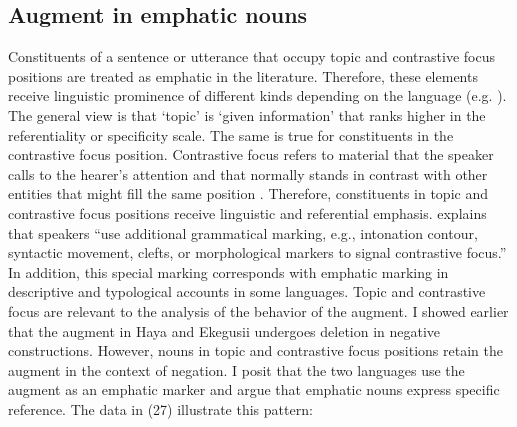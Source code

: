 \documentclass[output=paper]{langscibook}
\begin{document}
\subsection{Augment in emphatic nouns}
Constituents of a sentence or utterance that occupy topic and contrastive focus positions are treated as emphatic in the literature. Therefore, these elements receive linguistic prominence of different kinds depending on the language (e.g. \cite{gundel2004topic}). The general view is that ‘topic’ is ‘given information’ that ranks higher in the referentiality or specificity scale. The same is true for constituents in the contrastive focus position. Contrastive focus refers to material that the speaker calls to the hearer’s attention and that normally stands in contrast with other entities that might fill the same position \citep[181]{gundel2004topic}. Therefore, constituents in topic and contrastive focus positions receive linguistic and referential emphasis. \cite{zimmermann2008contrastive} explains that speakers “use additional grammatical marking, e.g., intonation contour, syntactic movement, clefts, or morphological markers to signal contrastive focus.” In addition, this special marking corresponds with emphatic marking in descriptive and typological accounts in some languages. Topic and contrastive focus are relevant to the analysis of the behavior of the augment. I showed earlier that the augment in Haya and Ekegusii undergoes deletion in negative constructions. However, nouns in topic and contrastive focus positions retain the augment in the context of negation. I posit that the two languages use the augment as an emphatic marker and argue that emphatic nouns express specific reference. The data in (27) illustrate this pattern:
\end{document}
